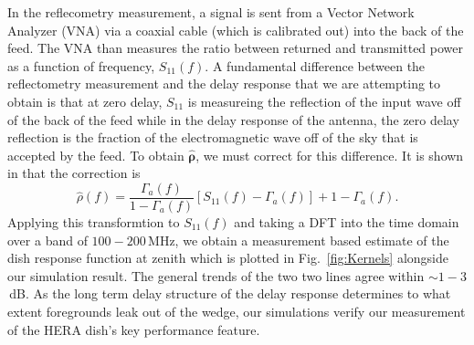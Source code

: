 \documentclass[twocolumn]{emulateapj}
\begin{document}
In the reflecometry measurement, a signal is sent from a Vector Network Analyzer (VNA) via a coaxial cable (which is calibrated out) into the back of the feed. The VNA than measures the ratio between returned and transmitted power as a function of frequency, $S_{11}(f)$. A fundamental difference between the reflectometry measurement and the delay response that we are attempting to obtain is that at zero delay, $S_{11}$ is measureing the reflection of the input wave off of the back of the feed while in the delay response of the antenna, the zero delay reflection is the fraction of the electromagnetic wave off of the sky that is accepted by the feed. To obtain $\boldsymbol{\widehat{\rho}}$, we must correct for this difference. It is shown in \citep{Patra:2015} that the correction is 
\begin{equation}
\widehat{\rho}(f) = \frac{\Gamma_a(f)}{1-\Gamma_a(f)} \left[ S_{11}(f) - \Gamma_a(f) \right] + 1 - \Gamma_a(f).
\end{equation}
Applying this transformtion to $S_{11}(f)$ and taking a DFT into the time domain over a band of $100-200$\,MHz, we obtain a measurement based estimate of the dish response function at zenith which is plotted in Fig.~\ref{fig:Kernels} alongside our simulation result. The general trends of the two two lines agree within $\sim 1-3$\,dB. As the long term delay structure of the delay response determines to what extent foregrounds leak out of the wedge, our simulations verify our measurement of the HERA dish's key performance feature.
\end{document}
